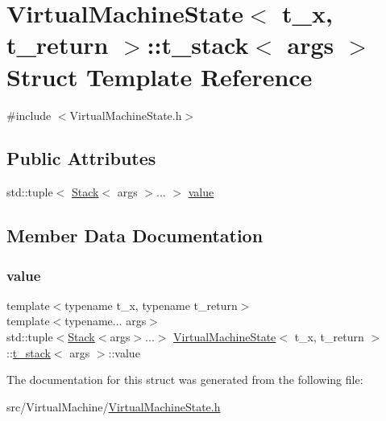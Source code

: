 \hypertarget{struct_virtual_machine_state_1_1t__stack}{}\section{Virtual\+Machine\+State$<$ t\+\_\+x, t\+\_\+return $>$\+:\+:t\+\_\+stack$<$ args $>$ Struct Template Reference}
\label{struct_virtual_machine_state_1_1t__stack}


{\ttfamily \#include $<$Virtual\+Machine\+State.\+h$>$}

\subsection*{Public Attributes}
\begin{DoxyCompactItemize}
\item 
std\+::tuple$<$ \hyperlink{class_stack}{Stack}$<$ args $>$... $>$ \hyperlink{struct_virtual_machine_state_1_1t__stack_a455e35013f15a7e7b328da628d711e49}{value}
\end{DoxyCompactItemize}


\subsection{Member Data Documentation}
\mbox{\label{struct_virtual_machine_state_1_1t__stack_a455e35013f15a7e7b328da628d711e49}} 
\subsubsection{\texorpdfstring{value}{value}}
{\footnotesize\ttfamily template$<$typename t\+\_\+x, typename t\+\_\+return$>$ \\
template$<$typename... args$>$ \\
std\+::tuple$<$\hyperlink{class_stack}{Stack}$<$args$>$...$>$ \hyperlink{class_virtual_machine_state}{Virtual\+Machine\+State}$<$ t\+\_\+x, t\+\_\+return $>$\+::\hyperlink{struct_virtual_machine_state_1_1t__stack}{t\+\_\+stack}$<$ args $>$\+::value}



The documentation for this struct was generated from the following file\+:\begin{DoxyCompactItemize}
\item 
src/\+Virtual\+Machine/\hyperlink{_virtual_machine_state_8h}{Virtual\+Machine\+State.\+h}\end{DoxyCompactItemize}
